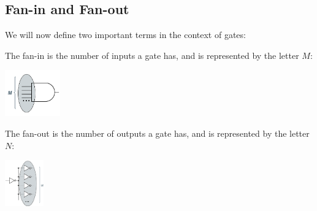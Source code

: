 \documentclass[nobib,fleqn,8pt]{article}
\begin{document}
\subsection{Fan-in and Fan-out}
We will now define two important terms in the context of gates: \newpage
\begin{defbox}
    The fan-in is the number of inputs a gate has, and is represented by the letter $M$:
    \begin{center}
        \includegraphics*[height = 75px]{images/fanin.png}
    \end{center}
\end{defbox}
\begin{defbox}
    The fan-out is the number of outputs a gate has, and is represented by the letter $N$:
    \begin{center}
        \includegraphics*[height = 75px]{images/fanout.png}
    \end{center}
\end{defbox}
\end{document}
